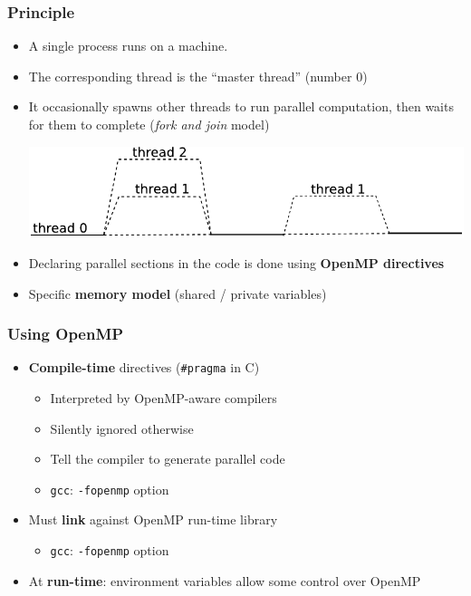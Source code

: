 \documentclass{beamer}
\begin{document}
\begin{frame}
  \frametitle{Principle}
\begin{itemize}
  
\item A single process runs on a machine.
\item The corresponding thread is the ``\alert{master} thread'' (number 0)
  
\item It occasionally spawns other threads to run parallel computation, then
  waits for them to complete  (\textit{fork and join} model)

  \smallskip
  \begin{center}
    \includegraphics[width=0.9\linewidth]{fork_and_join}
  \end{center}
  \bigskip
  
\item Declaring parallel sections in the code is done using \textbf{OpenMP directives}

\item Specific \textbf{memory model} (shared / private variables)
\end{itemize}
\end{frame}

\begin{frame}
  \frametitle{Using OpenMP}
  
\begin{itemize}
\item \textbf{Compile-time} directives ({\tt \#pragma} in C)
  \begin{itemize}
  \item Interpreted by OpenMP-aware compilers
  \item \alert{Silently} ignored otherwise
  \item Tell the compiler to generate parallel code
  \item \texttt{gcc}: \texttt{-fopenmp} option
  \end{itemize}

\medskip
  
\item Must \textbf{link} against OpenMP run-time library
  \begin{itemize}
  \item \texttt{gcc}: \texttt{-fopenmp} option
  \end{itemize}

\medskip
  
\item At \textbf{run-time}: \alert{environment variables} allow some control over OpenMP
\end{itemize}
\end{frame}
\end{document}
